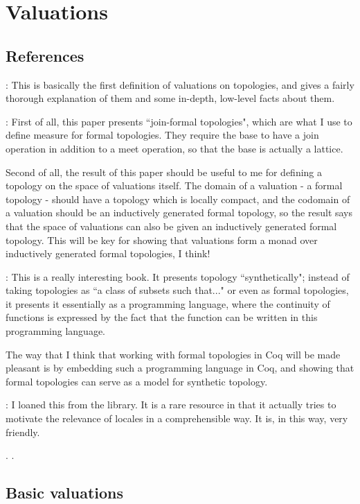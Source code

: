 \documentclass{article}           %
\begin{document}
\section{Valuations}

\subsection{References}

\cite{jones1990}: This is basically the first definition of valuations on topologies, and gives a fairly thorough explanation of them and some in-depth, low-level facts about them.

\cite{maietti2005}: First of all, this paper presents ``join-formal topologies", which are what I use to define measure for formal topologies. They require the base to have a join operation in addition to a meet operation, so that the base is actually a lattice.

Second of all, the result of this paper should be useful to me for defining a topology on the space of valuations itself. The domain of a valuation - a formal topology - should have a topology which is locally compact, and the codomain of a valuation should be an inductively generated formal topology, so the result says that the space of valuations can also be given an inductively generated formal topology. This will be key for showing that valuations form a monad over inductively generated formal topologies, I think!

\cite{escardo2004}: This is a really interesting book. It presents topology ``synthetically"; instead of taking topologies as ``a class of subsets such that..." or even as formal topologies, it presents it essentially as a programming language, where the continuity of functions is expressed by the fact that the function can be written in this programming language.

The way that I think that working with formal topologies in Coq will be made pleasant is by embedding such a programming language in Coq, and showing that formal topologies can serve as a model for synthetic topology.

\cite{vickers1989}: I loaned this from the library. It is a rare resource in that it actually tries to motivate the relevance of locales in a comprehensible way. It is, in this way, very friendly.

\cite{coquand2003}. \cite{sambin2000}.

\subsection{Basic valuations}
\end{document}
